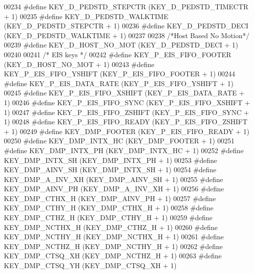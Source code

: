 \begin{DoxyCode}
00234 \textcolor{preprocessor}{#define KEY\_D\_PEDSTD\_STEPCTR        (KEY\_D\_PEDSTD\_TIMECTR + 1)}
00235 \textcolor{preprocessor}{#define KEY\_D\_PEDSTD\_WALKTIME       (KEY\_D\_PEDSTD\_STEPCTR + 1)}
00236 \textcolor{preprocessor}{#define KEY\_D\_PEDSTD\_DECI           (KEY\_D\_PEDSTD\_WALKTIME + 1)}
00237 
00238 \textcolor{comment}{/*Host Based No Motion*/}
00239 \textcolor{preprocessor}{#define KEY\_D\_HOST\_NO\_MOT           (KEY\_D\_PEDSTD\_DECI + 1)}
00240 
00241 \textcolor{comment}{/* EIS keys */}
00242 \textcolor{preprocessor}{#define KEY\_P\_EIS\_FIFO\_FOOTER       (KEY\_D\_HOST\_NO\_MOT + 1)}
00243 \textcolor{preprocessor}{#define KEY\_P\_EIS\_FIFO\_YSHIFT       (KEY\_P\_EIS\_FIFO\_FOOTER + 1)}
00244 \textcolor{preprocessor}{#define KEY\_P\_EIS\_DATA\_RATE         (KEY\_P\_EIS\_FIFO\_YSHIFT + 1)}
00245 \textcolor{preprocessor}{#define KEY\_P\_EIS\_FIFO\_XSHIFT       (KEY\_P\_EIS\_DATA\_RATE + 1)}
00246 \textcolor{preprocessor}{#define KEY\_P\_EIS\_FIFO\_SYNC         (KEY\_P\_EIS\_FIFO\_XSHIFT + 1)}
00247 \textcolor{preprocessor}{#define KEY\_P\_EIS\_FIFO\_ZSHIFT       (KEY\_P\_EIS\_FIFO\_SYNC + 1)}
00248 \textcolor{preprocessor}{#define KEY\_P\_EIS\_FIFO\_READY        (KEY\_P\_EIS\_FIFO\_ZSHIFT + 1)}
00249 \textcolor{preprocessor}{#define KEY\_DMP\_FOOTER              (KEY\_P\_EIS\_FIFO\_READY + 1)}
00250 \textcolor{preprocessor}{#define KEY\_DMP\_INTX\_HC             (KEY\_DMP\_FOOTER + 1)}
00251 \textcolor{preprocessor}{#define KEY\_DMP\_INTX\_PH             (KEY\_DMP\_INTX\_HC + 1)}
00252 \textcolor{preprocessor}{#define KEY\_DMP\_INTX\_SH             (KEY\_DMP\_INTX\_PH + 1)}
00253 \textcolor{preprocessor}{#define KEY\_DMP\_AINV\_SH             (KEY\_DMP\_INTX\_SH + 1)}
00254 \textcolor{preprocessor}{#define KEY\_DMP\_A\_INV\_XH            (KEY\_DMP\_AINV\_SH + 1)}
00255 \textcolor{preprocessor}{#define KEY\_DMP\_AINV\_PH             (KEY\_DMP\_A\_INV\_XH + 1)}
00256 \textcolor{preprocessor}{#define KEY\_DMP\_CTHX\_H              (KEY\_DMP\_AINV\_PH + 1)}
00257 \textcolor{preprocessor}{#define KEY\_DMP\_CTHY\_H              (KEY\_DMP\_CTHX\_H + 1)}
00258 \textcolor{preprocessor}{#define KEY\_DMP\_CTHZ\_H              (KEY\_DMP\_CTHY\_H + 1)}
00259 \textcolor{preprocessor}{#define KEY\_DMP\_NCTHX\_H             (KEY\_DMP\_CTHZ\_H + 1)}
00260 \textcolor{preprocessor}{#define KEY\_DMP\_NCTHY\_H             (KEY\_DMP\_NCTHX\_H + 1)}
00261 \textcolor{preprocessor}{#define KEY\_DMP\_NCTHZ\_H             (KEY\_DMP\_NCTHY\_H + 1)}
00262 \textcolor{preprocessor}{#define KEY\_DMP\_CTSQ\_XH             (KEY\_DMP\_NCTHZ\_H + 1)}
00263 \textcolor{preprocessor}{#define KEY\_DMP\_CTSQ\_YH             (KEY\_DMP\_CTSQ\_XH + 1)}

\end{DoxyCode}

